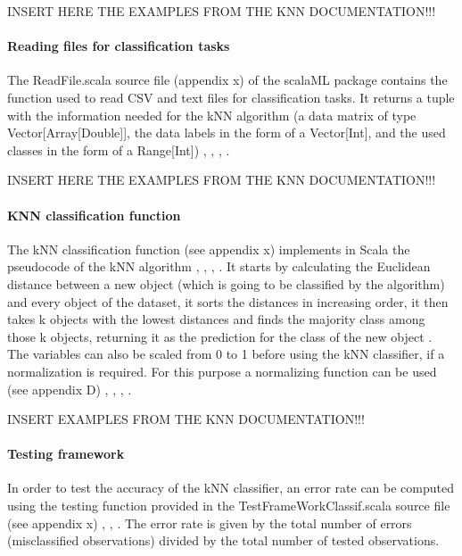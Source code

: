 \documentclass {article}
\begin{document}
INSERT HERE THE EXAMPLES FROM THE KNN DOCUMENTATION!!!

\paragraph {Reading files for classification tasks}

The ReadFile.scala source file (appendix x) of the scalaML package contains the function used to read CSV and text files for classification tasks. It returns a tuple with the information needed for the kNN algorithm (a data matrix of type Vector[Array[Double]], the data labels in the form of a Vector[Int],  and the used classes in the form of a Range[Int]) \cite{harrington_machine_2012}, \cite{odersky_programming_2010}, \cite{swartz_learning_2015}, \cite{epfl_scala_2017}.
 
INSERT HERE THE EXAMPLES FROM THE KNN DOCUMENTATION!!!

\paragraph {KNN classification function}

The kNN classification function (see appendix x) implements in Scala the pseudocode of the kNN algorithm \cite{harrington_machine_2012}, \cite{odersky_programming_2010}, \cite{swartz_learning_2015}, \cite{epfl_scala_2017}. 
It starts by calculating the Euclidean distance between a new object (which is going to be classified by the algorithm) and every object of the dataset, it sorts the distances in increasing order, it then takes k objects with the lowest distances and finds the majority class among those k objects, returning it as the prediction for the class of the new object \cite{harrington_machine_2012}.
The variables can also be scaled from 0 to 1 before using the kNN classifier, if a normalization is required. For this purpose a normalizing function can be used (see appendix D) \cite{quinn_experimental_2002}, \cite{harrington_machine_2012}, \cite{odersky_programming_2010}, \cite{epfl_scala_2017}. 

INSERT EXAMPLES FROM THE KNN DOCUMENTATION!!! 

\paragraph{Testing framework}    

In order to test the accuracy of the kNN classifier, an error rate can be computed using the testing function provided in the TestFrameWorkClassif.scala source file (see appendix x) \cite{harrington_machine_2012}, \cite{odersky_programming_2010}, \cite{epfl_scala_2017}.
 The error rate is given by the total number of errors (misclassified observations) divided by the total number of tested observations. 
\end{document}
